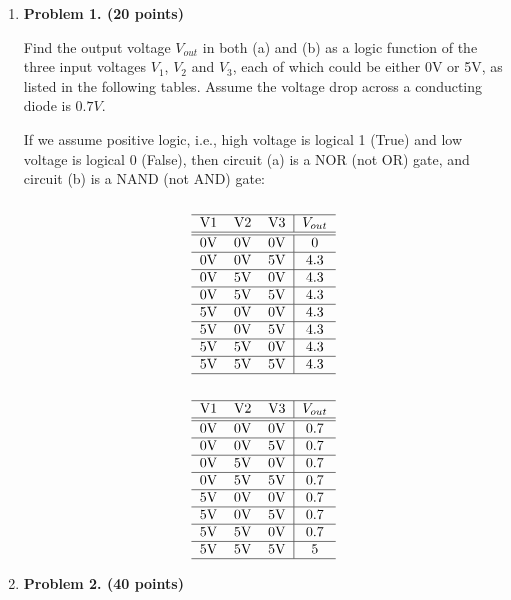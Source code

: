 \begin{enumerate}

\item {\bf Problem 1. (20 points)} 

Find the output voltage $V_{out}$ in both (a) and (b) as a logic function of 
the three input voltages $V_1$, $V_2$ and $V_3$, each of which could be either 
0V or 5V, as listed in the following tables. Assume the voltage drop across 
a conducting diode is $0.7V$.


If we assume positive logic, i.e., high voltage is logical 1 (True) and low 
voltage is logical 0 (False), then circuit (a) is a NOR (not OR) gate, and 
circuit (b) is a NAND (not AND) gate:
\[
\begin{tabular}{ccc|c}\\ \hline 
V1 & V2 & V3 & $V_{out}$ \\ \hline \hline
0V & 0V & 0V &     0     \\ \hline
0V & 0V & 5V &    4.3    \\ \hline
0V & 5V & 0V &    4.3    \\ \hline
0V & 5V & 5V &    4.3    \\ \hline
5V & 0V & 0V &    4.3    \\ \hline
5V & 0V & 5V &    4.3    \\ \hline
5V & 5V & 0V &    4.3    \\ \hline
5V & 5V & 5V &    4.3    \\ \hline
\end{tabular}
\]
\[
\begin{tabular}{ccc|c}\\ \hline
V1 & V2 & V3 & $V_{out}$ \\ \hline \hline
0V & 0V & 0V &     0.7   \\ \hline
0V & 0V & 5V &     0.7   \\ \hline
0V & 5V & 0V &     0.7   \\ \hline
0V & 5V & 5V &     0.7   \\ \hline
5V & 0V & 0V &     0.7   \\ \hline
5V & 0V & 5V &     0.7   \\ \hline
5V & 5V & 0V &     0.7   \\ \hline
5V & 5V & 5V &     5     \\ \hline
\end{tabular}
\]

\item {\bf Problem 2. (40 points)} 


\end{enumerate}
